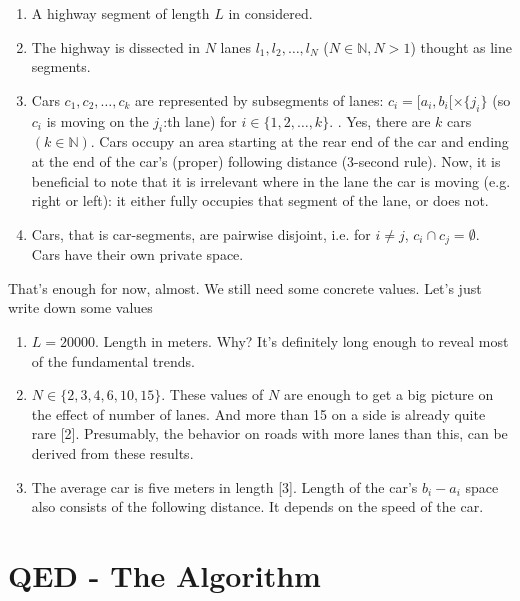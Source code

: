 \documentclass[12pt]{article}
\begin{document}
\begin{enumerate}

\item A highway segment of length $L$ in considered.
\item The highway is dissected in $N$ lanes $l_{1},l_{2}, \ldots, l_{N}$ ($N \in \mathbb{N}, N > 1$) thought as line segments.
\item Cars $c_{1}, c_{2},\ldots,c_{k}$ are represented by subsegments of lanes: $c_{i} = [a_{i},b_{i}[ \times\{ j_{i}\}$ (so $c_{i}$ is moving on the $j_{i}$:th lane) for $i \in \{1,2,\ldots,k \}$. . Yes, there are $k$ cars $(k \in \mathbb{N})$. Cars occupy an area starting at the rear end of the car and ending at the end of the car's (proper) following distance (3-second rule).  Now, it is beneficial to note that it is irrelevant where in the lane the car is moving (e.g. right or left): it either fully occupies that segment of the lane, or does not.
\item Cars, that is car-segments, are pairwise disjoint, i.e. for $i \neq j$, $c_{i} \cap c_{j} = \emptyset$. Cars have their own private space.

\end{enumerate}

That's enough for now, almost. We still need some concrete values. Let's just write down some values

\begin{enumerate}

\item $L = 20000$. Length in meters. Why? It's definitely long enough to reveal most of the fundamental trends.%
\item $N \in \{2,3,4,6,10,15\}$. These values of $N$ are enough to get a big picture on the effect of number of lanes. And more than 15 on a side is already quite rare [2].%
  Presumably, the behavior on roads with more lanes than this, can be derived from these results.
\item The average car is five meters in length [3]. Length of the car's $b_{i}-a_{i}$ space also consists of the following distance. It depends on the speed of the car.


\end{enumerate}




\newpage

\section{QED - The Algorithm}
\end{document}

